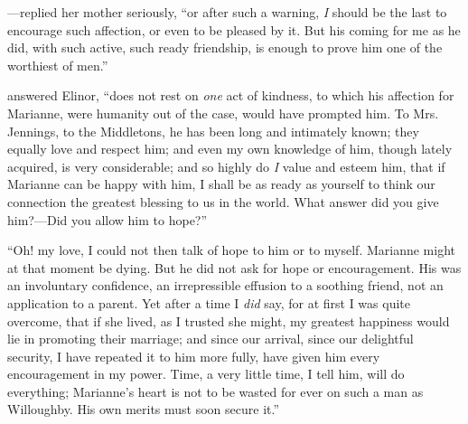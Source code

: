 ---replied her mother seriously, “or after such a warning, {\em I} should be the last to encourage such affection, or even to be pleased by it. But his coming for me as he did, with such active, such ready friendship, is enough to prove him one of the worthiest of men.”

 answered Elinor, “does not rest on {\em one} act of kindness, to which his affection for Marianne, were humanity out of the case, would have prompted him. To Mrs. Jennings, to the Middletons, he has been long and intimately known; they equally love and respect him; and even my own knowledge of him, though lately acquired, is very considerable; and so highly do {\em I} value and esteem him, that if Marianne can be happy with him, I shall be as ready as yourself to think our connection the greatest blessing to us in the world. What answer did you give him?---Did you allow him to hope?”

“Oh! my love, I could not then talk of hope to him or to myself. Marianne might at that moment be dying. But he did not ask for hope or encouragement. His was an involuntary confidence, an irrepressible effusion to a soothing friend, not an application to a parent. Yet after a time I {\em did} say, for at first I was quite overcome, that if she lived, as I trusted she might, my greatest happiness would lie in promoting their marriage; and since our arrival, since our delightful security, I have repeated it to him more fully, have given him every encouragement in my power. Time, a very little time, I tell him, will do everything; Marianne's heart is not to be wasted for ever on such a man as Willoughby. His own merits must soon secure it.”



